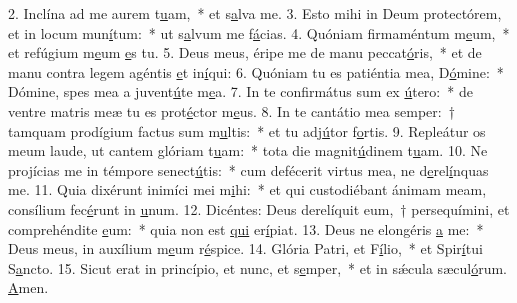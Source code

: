 2. Inclína ad me aurem t\uline{u}am,~* et s\uline{a}lva me.
3. Esto mihi in Deum protectórem, et in locum mun\uline{í}tum:~* ut s\uline{a}lvum me f\uline{á}cias.
4. Quóniam firmaméntum m\uline{e}um,~* et refúgium m\uline{e}um \uline{e}s tu.
5. Deus meus, éripe me de manu peccat\uline{ó}ris,~* et de manu contra legem agéntis \uline{e}t in\uline{í}qui:
6. Quóniam tu es patiéntia mea, D\uline{ó}mine:~* Dómine, spes mea a juvent\uline{ú}te m\uline{e}a.
7. In te confirmátus sum ex \uline{ú}tero:~* de ventre matris meæ tu es prot\uline{é}ctor m\uline{e}us.
8. In te cantátio mea semper:~† tamquam prodígium factus sum m\uline{u}ltis:~* et tu adj\uline{ú}tor f\uline{o}rtis.
9. Repleátur os meum laude, ut cantem glóriam t\uline{u}am:~* tota die magnit\uline{ú}dinem t\uline{u}am.
10. Ne projícias me in témpore senect\uline{ú}tis:~* cum defécerit virtus mea, ne d\uline{e}rel\uline{í}nquas me.
11. Quia dixérunt inimíci mei m\uline{i}hi:~* et qui custodiébant ánimam meam, consílium fec\uline{é}runt in \uline{u}num.
12. Dicéntes: Deus derelíquit eum,~† persequímini, et comprehéndite \uline{e}um:~* quia non est \uline{qui} er\uline{í}piat.
13. Deus ne elongéris \uline{a} me:~* Deus meus, in auxílium m\uline{e}um r\uline{é}spice.
14. Glória Patri, et F\uline{í}lio,~* et Spir\uline{í}tui S\uline{a}ncto.
15. Sicut erat in princípio, et nunc, et s\uline{e}mper,~* et in sǽcula sæcul\uline{ó}rum. \uline{A}men.
